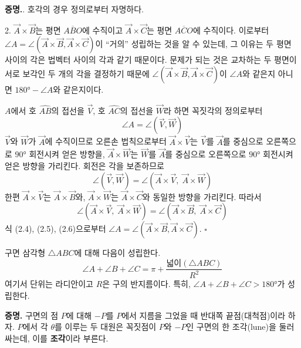 \documentclass{article}
\begin{document}
\textbf{증명.}. 호각의 경우 정의로부터 자명하다.

2. $\vec{A}\times\vec{B}$는 평면 $\overline{ABO}$에 수직이고 $\vec{A}\times\vec{C}$는 평면 $\overline{ACO}$에 수직이다.
이로부터 $\angle A = \angle(\vec{A}\times\vec{B}, \vec{A}\times\vec{C})$이 ``거의'' 성립하는 것을 알 수 있는데,
그 이유는 두 평면 사이의 각은 법벡터 사이의 각과 같기 때문이다.
문제가 되는 것은 교차하는 두 평면이 서로 보각인 두 개의 각을 결정하기 때문에
$\angle(\vec{A}\times\vec{B},\vec{A}\times\vec{C})$이 $\angle A$와 같은지 아니면
$180°-\angle A$와 같은지이다.

$A$에서 호 $\widehat{AB}$의 접선을 $\vec{V}$, 호 $\widehat{AC}$의 접선을 $\vec{W}$라 하면
꼭짓각의 정의로부터
\[
  \angle A = \angle(\vec{V}, \vec{W}) \tag{2.4}
\]
$\vec{V}$와 $\vec{W}$가 $\vec{A}$에 수직이므로 오른손 법칙으로부터
$\vec{A}\times\vec{V}$는 $\vec{V}$를 $\vec{A}$를 중심으로 오른쪽으로 $90°$ 회전시켜 얻은 방향을,
$\vec{A}\times\vec{W}$는 $\vec{W}$를 $\vec{A}$를 중심으로 오른쪽으로 $90°$ 회전시켜 얻은 방향을 가리킨다.
회전은 각을 보존하므로
\[
  \angle(\vec{V},\vec{W}) = \angle(\vec{A}\times\vec{V},\;\vec{A}\times\vec{W}) \tag{2.5}
\]
한편 $\vec{A}\times\vec{V}$는 $\vec{A}\times\vec{B}$와, $\vec{A}\times\vec{W}$는 $\vec{A}\times\vec{C}$와 동일한 방향을 가리킨다.
따라서
\[
  \angle(\vec{A}\times\vec{V},\;\vec{A}\times\vec{W}) = \angle(\vec{A}\times\vec{B},\;\vec{A}\times\vec{C}) \tag{2.6}
\]
식 (2.4), (2.5), (2.6)으로부터 $\angle A = \angle(\vec{A}\times\vec{B},\vec{A}\times\vec{C})$. \hfill $\square$

\begin{tcolorbox}[
  colback=red!4, colframe=red!60!black,
  title=정리 2.3.1,
  fonttitle=\bfseries, boxrule=0.5mm, arc=3mm]

구면 삼각형 $\triangle ABC$에 대해 다음이 성립한다.
\[
  \angle A + \angle B + \angle C = \pi + \frac{\text{넓이}(\triangle ABC)}{R^2} \tag{2.7}
\]
여기서 단위는 라디안이고 $R$은 구의 반지름이다.
특히, $\angle A + \angle B + \angle C > 180°$가 성립한다.

\end{tcolorbox}

\textbf{증명.}\quad
구면의 점 $P$에 대해 $-P$를 $P$에서 지름을 그었을 때 반대쪽 끝점(대척점)이라 하자.
$P$에서 각 $\theta$를 이루는 두 대원은 꼭짓점이 $P$와 $-P$인 구면의 한 조각(lune)을 둘러싸는데,
이를 \textbf{조각}이라 부른다.
\end{document}
